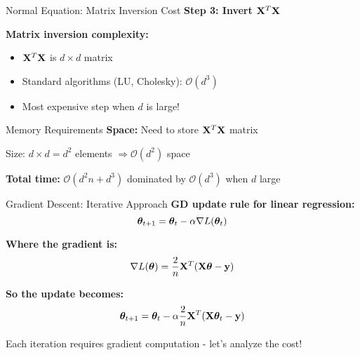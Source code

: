 \documentclass[usenames,dvipsnames]{beamer}
\begin{document}
  \begin{frame}{Normal Equation: Matrix Inversion Cost}
    \textbf{Step 3: Invert $\mathbf{X}^T\mathbf{X}$}
    
    \pause
    \textbf{Matrix inversion complexity:}
    \begin{itemize}[<+->]
        \item $\mathbf{X}^T\mathbf{X}$ is $d \times d$ matrix
        \item Standard algorithms (LU, Cholesky): $\mathcal{O}(d^3)$
        \item Most expensive step when $d$ is large!
    \end{itemize}
    
    \pause
    \begin{alertbox}{Memory Requirements}
    \textbf{Space:} Need to store $\mathbf{X}^T\mathbf{X}$ matrix
    
    Size: $d \times d = d^2$ elements $\Rightarrow \mathcal{O}(d^2)$ space
    \end{alertbox}
    
    \pause
    \begin{keypointsbox}{}
    \textbf{Total time:} $\mathcal{O}(d^2n + d^3)$ dominated by $\mathcal{O}(d^3)$ when $d$ large
    \end{keypointsbox}
  \end{frame}

  \begin{frame}{Gradient Descent: Iterative Approach}
    \textbf{GD update rule for linear regression:}
    $$\boldsymbol{\theta}_{t+1} = \boldsymbol{\theta}_t - \alpha \nabla L(\boldsymbol{\theta}_t)$$
    
    \pause
    \textbf{Where the gradient is:}
    $$\nabla L(\boldsymbol{\theta}) = \frac{2}{n}\mathbf{X}^T(\mathbf{X}\boldsymbol{\theta} - \mathbf{y})$$
    
    \pause
    \textbf{So the update becomes:}
    $$\boldsymbol{\theta}_{t+1} = \boldsymbol{\theta}_t - \alpha \frac{2}{n}\mathbf{X}^T(\mathbf{X}\boldsymbol{\theta}_t - \mathbf{y})$$
    
    \pause
    \begin{keypointsbox}{}
    Each iteration requires gradient computation - let's analyze the cost!
    \end{keypointsbox}
  \end{frame}
\end{document}
